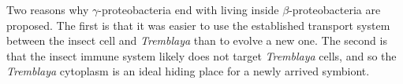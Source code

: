 \documentclass[11pt]{article}
\begin{document}
\begin{sloppypar}
\par

Two reasons why $\gamma$-proteobacteria end with living inside $\beta$-proteobacteria are proposed. 
The first is that it was easier to use the established transport system between the insect cell and \textit{Tremblaya} than to evolve a new one. 
The second is that the insect immune system likely does not target \textit{Tremblaya} cells, and so the \textit{Tremblaya} cytoplasm is an ideal hiding place for a newly arrived symbiont.
  
\end{sloppypar}
\end{document}
